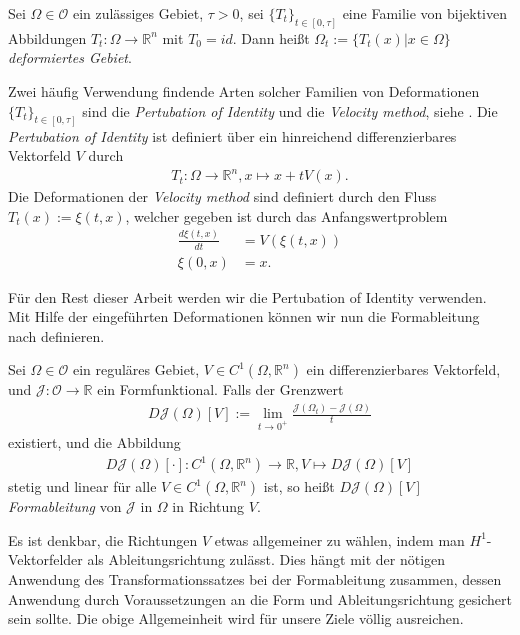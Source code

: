 \begin{defi}
Sei $\Omega\in\mathcal{O}$ ein zulässiges Gebiet, $\tau > 0$, sei $\{T_t\}_{t\in [0,\tau]}$ eine Familie von bijektiven Abbildungen $T_t: \Omega \rightarrow \mathbb{R}^n$ mit $T_0 = id$. Dann heißt $\Omega_t := \{T_t(x) \vert x\in\Omega\}$ \textit{deformiertes Gebiet}.
\end{defi}

Zwei häufig Verwendung findende Arten solcher Familien von Deformationen $\{T_t\}_{t\in [0,\tau]}$ sind die \textit{Pertubation of Identity} und die \textit{Velocity method}, siehe \cite{bfgs2}. Die \textit{Pertubation of Identity} ist definiert über ein hinreichend differenzierbares Vektorfeld $V$ durch
\begin{align*}
	T_t: \Omega \rightarrow \mathbb{R}^n, x \mapsto x + tV(x).
\end{align*}
Die Deformationen der \textit{Velocity method} sind definiert durch den Fluss $T_t(x) := \xi(t,x)$, welcher gegeben ist durch das Anfangswertproblem
\begin{align*}
	\frac{d\xi(t,x)}{dt} &= V(\xi(t,x))\\
	\xi(0,x) 		&= x.
\end{align*}

Für den Rest dieser Arbeit werden wir die Pertubation of Identity verwenden. Mit Hilfe der eingeführten Deformationen können wir nun die Formableitung nach \cite{bfgs2} definieren. 

\begin{defi}[Formableitung]
Sei $\Omega \in \mathcal{O}$ ein reguläres Gebiet, $V\in C^1(\Omega,\mathbb{R}^n)$ ein differenzierbares Vektorfeld, und $\mathcal{J}: \mathcal{O} \rightarrow \mathbb{R}$ ein Formfunktional. Falls der Grenzwert
\begin{align*}
	D\mathcal{J}(\Omega)[V] := \underset{t \rightarrow 0^+}{\lim}
	\frac{\mathcal{J}(\Omega_t) - \mathcal{J}(\Omega)}{t}
\end{align*}
existiert, und die Abbildung 
\begin{align*}
	D\mathcal{J}(\Omega)[\cdot]: C^1(\Omega,\mathbb{R}^n) \rightarrow 						\mathbb{R}, V \mapsto D\mathcal{J}(\Omega)[V]
\end{align*}
stetig und linear für alle $V \in C^1(\Omega,\mathbb{R}^n)$ ist, so heißt $D\mathcal{J}(\Omega)[V]$ \textit{Formableitung} von $\mathcal{J}$ in $\Omega$ in Richtung $V$.
\end{defi}

Es ist denkbar, die Richtungen $V$ etwas allgemeiner zu wählen, indem man $H^1$-Vektorfelder als Ableitungsrichtung zulässt. Dies hängt mit der nötigen Anwendung des Transformationssatzes bei der Formableitung zusammen, dessen Anwendung durch Voraussetzungen an die Form und Ableitungsrichtung gesichert sein sollte. Die obige Allgemeinheit wird für unsere Ziele völlig ausreichen.

